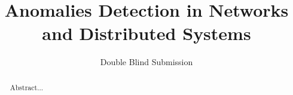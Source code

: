 \documentclass[draft]{sig-alternate}
\begin{document}

\title{Anomalies Detection in Networks and Distributed Systems}


\author{
	\alignauthor
	Double Blind Submission
%
}

\maketitle

\begin{abstract}
Abstract...
\end{abstract}


\end{document}
